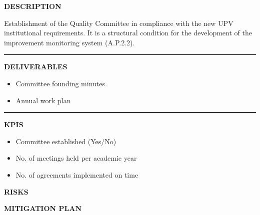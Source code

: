 \documentclass[11pt,a4paper]{scrreprt}
\newcommand{\fieldlabel}[1]{%
  {\footnotesize\sffamily\bfseries\color{mutedcolor}\MakeUppercase{#1}}\par\nopagebreak[4]
}
\newcommand{\fieldsep}{\vspace{3pt}\noindent\textcolor{bordercolor}{\rule{\linewidth}{0.4pt}}\vspace{3pt}\par}
\begin{document}
\begin{tcolorbox}[pabox={gobcolor}{A.P.1.1 \enspace\textbullet\enspace Establishment of the Quality Committee}]

\fieldlabel{Description}
{\small Establishment of the Quality Committee in compliance with the new UPV institutional requirements. It is a structural condition for the development of the improvement monitoring system (A.P.2.2).}\par
\fieldsep
\fieldlabel{Deliverables}
{\small \begin{itemize}[noitemsep,topsep=2pt]
\item Committee founding minutes
\item Annual work plan
\end{itemize}}\par
\fieldsep
\fieldlabel{KPIs}
{\small \begin{itemize}[noitemsep,topsep=2pt]
\item Committee established (Yes/No)
\item No. of meetings held per academic year
\item No. of agreements implemented on time
\end{itemize}}\par
\end{tcolorbox}
\begin{tcolorbox}[riskbox]
{\footnotesize\sffamily\bfseries\color{red!50!black} RISKS}\par{}
\end{tcolorbox}
\begin{tcolorbox}[mitbox]
{\footnotesize\sffamily\bfseries\color{green!40!black} MITIGATION PLAN}\par{}
\end{tcolorbox}
\vspace{8pt}
\end{document}
